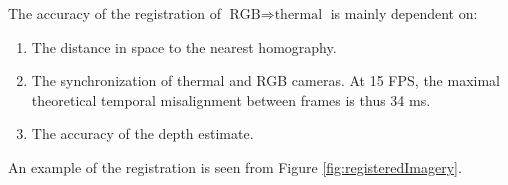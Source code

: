 \documentclass[10pt,twocolumn,letterpaper]{article}
\begin{document}
The accuracy of the registration of $\text{RGB} \Rightarrow \text{thermal}$ is mainly dependent on: 
\begin{enumerate}
	\item The distance in space to the nearest homography. %
	\item The synchronization of thermal and RGB cameras. At 15 FPS, the maximal theoretical temporal misalignment between frames is thus 34 ms. 
	\item The accuracy of the depth estimate.
\end{enumerate}
An example of the registration is seen from Figure \ref{fig:registeredImagery}. 
\end{document}
